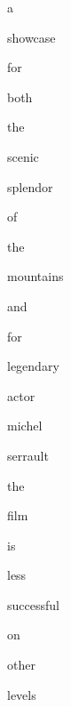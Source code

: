 \documentclass[varwidth]{standalone}
\begin{document}
\begin{CJK*}{UTF8}{gbsn}
{\setlength{\fboxsep}{0pt}\colorbox{white!0}{\parbox{0.8\textwidth}{
\colorbox{blue!1.7685164}{\strut a} \colorbox{blue!4.155342}{\strut showcase} \colorbox{red!1.9681215}{\strut for} \colorbox{red!0.45121643}{\strut both} \colorbox{red!0.67102355}{\strut the} \colorbox{red!0.60406244}{\strut scenic} \colorbox{red!2.4506834}{\strut splendor} \colorbox{red!0.20741911}{\strut of} \colorbox{red!0.23853795}{\strut the} \colorbox{red!0.19160502}{\strut mountains} \colorbox{red!0.57252914}{\strut and} \colorbox{red!1.206459}{\strut for} \colorbox{blue!4.131342}{\strut legendary} \colorbox{red!2.781887}{\strut actor} \colorbox{blue!0.22740367}{\strut michel} \colorbox{red!1.7681625}{\strut serrault} \colorbox{red!2.3046427}{\strut the} \colorbox{red!6.067427}{\strut film} \colorbox{blue!0.34805852}{\strut is} \colorbox{red!96.73826}{\strut less} \colorbox{red!15.9471035}{\strut successful} \colorbox{red!2.286625}{\strut on} \colorbox{red!0.6011058}{\strut other} \colorbox{red!2.5795138}{\strut levels} 
}}}
\end{CJK*}
\end{document}

